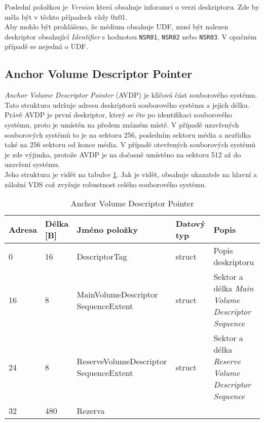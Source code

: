 Poslední položkou je \textit{Version} která obsahuje inforamci o verzi deskriptoru. Zde by měla být v těchto případech vždy 0x01.\\
Aby mohlo být prohlášeno, že médium obsahuje UDF, musí být nalezen deskriptor obsahující \textit{Identifier} s hodnotou \texttt{NSR01}, \texttt{NSR02} nebo \texttt{NSR03}. V opačném případě se nejedná o UDF.

\subsection{Anchor Volume Descriptor Pointer}
\label{sec:avdp}
\textit{Anchor Volume Descriptor Pointer} (AVDP) je klíčová část souborového systému. Tato struktura udržuje adresu deskriptorů souborového systému a jejich délku. Právě AVDP je první deskriptor, který se čte po identifikaci souborového systému, proto je umístěn na předem známém místě. V případě uzavřených souborových systémů to je na sektoru 256, posledním sektoru média a nezřídka také na 256 sektoru od konce média. V případě otevřených souborových systémů je zde výjimka, protože AVDP je na dočasně umístěno na sektoru 512 až do uzavření systému.\\
Jeho struktura je vidět na tabulce \ref{tab-avdp}. Jak je vidět, obsahuje ukazatele na hlavní a záložní VDS což zvyšuje robustnost celého souborového systému.
\begin{table}
    \begin{tabular}{ | l | l | p{4.5cm} | p{1.3cm} | p{5.5cm} | }
        \hline
        Adresa  & Délka [B]   & Jméno položky & Datový typ    & Popis \\ \hline
        0       & 16          & DescriptorTag & struct        & Popis deskriptoru \\ \hline
        16      & 8           & MainVolumeDescriptor SequenceExtent & struct & Sektor a délka \textit{Main Volume Descriptor Sequence} \\ \hline
        24      & 8           & ReserveVolumeDescriptor SequenceExtent & struct & Sektor a délka \textit{Reserve Volume Descriptor Sequence} \\ \hline
        32      & 480         & Rezerva & & \\ \hline
    \end{tabular}
    \caption{Anchor Volume Descriptor Pointer\label{tab-avdp}}
\end{table}

